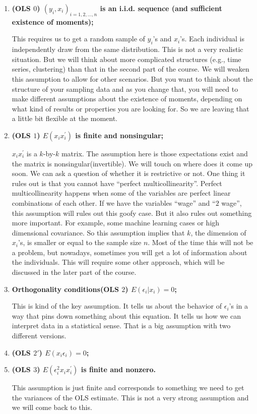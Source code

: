 \documentclass[11pt,a4paper]{amsart}
\theoremstyle{plain}
\theoremstyle{definition}
\begin{document}
	\begin{enumerate}
		\item \textbf{(OLS $0$) $(y_{i}, x_{i})_{i = 1,2, \dots,n}$ is an i.i.d. sequence (and sufficient existence of moments);}\par 
		This requires us to get a random sample of $y_{i}$'s and $x_{i}$'s. Each individual is independently draw from the same distribution. This is not a very realistic situation.  But we will think about more complicated structures (e.g., time series, clustering) than that in the second part of the course. We will weaken this assumption to allow for other scenarios. But you want to think about the structure of your sampling data and as you change that, you will need to make different assumptions about the existence of moments, depending on what kind of results or properties you are looking for. So we are leaving that a little bit flexible at the moment.
		\item \textbf{(OLS $1$) $E(x_{i}x_{i}^{'})$ is finite and nonsingular;}\par 
		$x_{i}x_{i}^{'}$ is a $k$-by-$k$ matrix. The assumption here is those expectations exist and the matrix is nonsingular(invertible). We will touch on where does it come up soon. We can ask a question of whether it is restrictive or not. One thing it rules out is that you cannot have ``perfect multicollinearity''. Perfect multicollinearity happens when some of the variables are perfect linear combinations of each other. If we have the variables ``wage'' and ``$2$ wage'', this assumption will rules out this goofy case. But it also rules out something more important. For example, some machine learning cases or high dimensional covariance. So this assumption implies that $k$, the dimension of $x_{i}$'s, is smaller or equal to the sample size $n$. Most of the time this will not be a problem, but nowadays, sometimes you will get a lot of information about the individuals.  This will require some other approach, which will be discussed in the later part of the course. 
		\item \textbf{Orthogonality conditions(OLS $2$) $E(\epsilon_{i} | x_{i}) = 0$;}\par 
		This is kind of the key assumption. It tells us about the behavior of $\epsilon_{i}$'s in a way that pins down something about this equation. It tells us how we can interpret data in a statistical sense. That is a big assumption with two different versions. 
		\item \textbf{(OLS $2'$) $E(x_{i}\epsilon_{i}) = 0$;}
		\item \textbf{(OLS $3$) $E(\epsilon_{i}^{2}x_{i}x^{'}_{i})$ is finite and nonzero.}\par
		This assumption is just finite and corresponds to something we need to get the variances of the OLS estimate. This is not a very strong assumption and we will come back to this.
	\end{enumerate}
\end{document}
